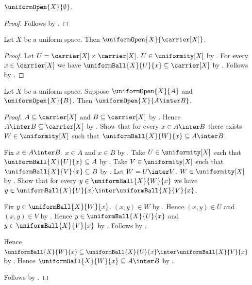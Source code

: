 \begin{proposition}\label{uniform_open_empty}
    $\uniformOpen{X}{\emptyset}$.
\end{proposition}
\begin{proof}
    Follows by .
\end{proof}

\begin{proposition}\label{uniform_open_carrier}
    Let $X$ be a uniform space.
    Then $\uniformOpen{X}{\carrier[X]}$.
\end{proposition}
\begin{proof}
    Let $U=\carrier[X]\times\carrier[X]$.
    $U\in\uniformity[X]$ by .
    For every $x\in\carrier[X]$ we have
        $\uniformBall{X}{U}{x}\subseteq\carrier[X]$
        by .
    Follows by .
\end{proof}

\begin{theorem}\label{uniform_open_intersection}
    Let $X$ be a uniform space.
    Suppose $\uniformOpen{X}{A}$ and $\uniformOpen{X}{B}$.
    Then $\uniformOpen{X}{A\inter B}$.
\end{theorem}
\begin{proof}
    $A\subseteq\carrier[X]$ and $B\subseteq\carrier[X]$
        by .
    Hence $A\inter B\subseteq\carrier[X]$
        by .
    Show that for every $x\in A\inter B$ there exists
        $W\in\uniformity[X]$ such that
            $\uniformBall{X}{W}{x}\subseteq A\inter B$.
    \begin{subproof}
        Fix $x\in A\inter B$.
        $x\in A$ and $x\in B$ by .
        Take $U\in\uniformity[X]$ such that
            $\uniformBall{X}{U}{x}\subseteq A$
            by .
        Take $V\in\uniformity[X]$ such that
            $\uniformBall{X}{V}{x}\subseteq B$
            by .
        Let $W=U\inter V$.
        $W\in\uniformity[X]$
            by .
        Show that for every $y\in\uniformBall{X}{W}{x}$ we have
            $y\in\uniformBall{X}{U}{x}\inter\uniformBall{X}{V}{x}$.
        \begin{subproof}
            Fix $y\in\uniformBall{X}{W}{x}$.
            $(x,y)\in W$ by .
            Hence $(x,y)\in U$ and $(x,y)\in V$ by .
            Hence $y\in\uniformBall{X}{U}{x}$ and
                $y\in\uniformBall{X}{V}{x}$
                by .
            Follows by .
        \end{subproof}
        Hence $\uniformBall{X}{W}{x}
            \subseteq\uniformBall{X}{U}{x}\inter\uniformBall{X}{V}{x}$
            by .
        Hence $\uniformBall{X}{W}{x}\subseteq A\inter B$
            by .
    \end{subproof}
    Follows by .
\end{proof}


